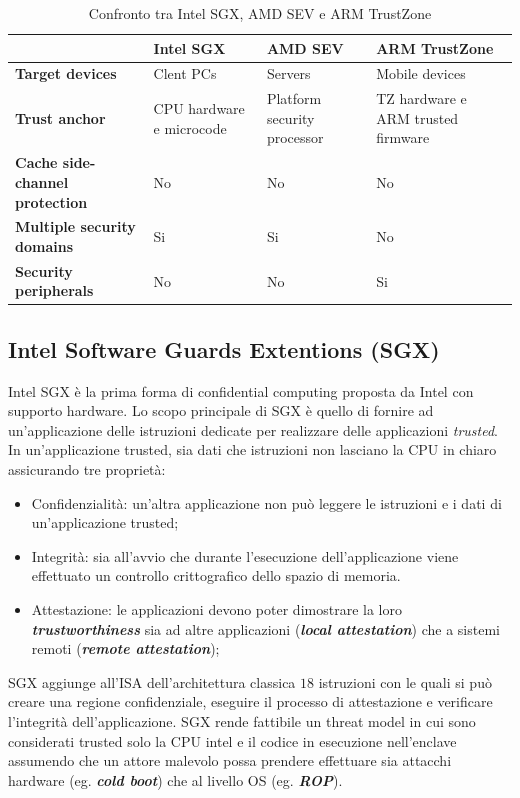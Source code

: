 \documentclass{article}
\begin{document}
\begin{table}
\centering
\begin{tabular}{|p{3cm}|p{3cm}|p{3cm}|p{3cm}|}
\hline
\textbf{} & \textbf{Intel SGX} & \textbf{AMD SEV} & \textbf{ARM TrustZone} \\ \hline
\textbf{Target devices} & Clent PCs & Servers & Mobile devices  \\ \hline
\textbf{Trust anchor} & CPU hardware e microcode & Platform security processor & TZ hardware e ARM trusted firmware \\ \hline
\textbf{Cache side-channel protection} & No  & No  & No \\ \hline
\textbf{Multiple security domains} & Si & Si & No \\ \hline
\textbf{Security peripherals} & No & No & Si \\ \hline
\end{tabular}
\caption{Confronto tra Intel SGX, AMD SEV e ARM TrustZone}
\label{tab:tee-implementations}
\end{table}

\subsection{Intel Software Guards Extentions (SGX)}
Intel SGX è la prima forma di confidential computing proposta da Intel con supporto hardware. Lo scopo principale di SGX è quello di fornire ad un'applicazione delle istruzioni dedicate per realizzare delle applicazioni \textit{trusted}. In un'applicazione trusted, sia dati che istruzioni non lasciano la CPU in chiaro assicurando tre proprietà:
\begin{itemize}
  \item Confidenzialità: un'altra applicazione non può leggere le istruzioni e i dati di un'applicazione trusted;
  \item Integrità: sia all'avvio che durante l'esecuzione dell'applicazione viene effettuato un controllo crittografico dello spazio di memoria. 
  \item Attestazione: le applicazioni devono poter dimostrare la loro \textbf{\textit{trustworthiness}} sia ad altre applicazioni (\textbf{\textit{local attestation}}) che a sistemi remoti (\textbf{\textit{remote attestation}});
\end{itemize}

SGX aggiunge all'ISA dell'architettura classica $18$ istruzioni con le quali si può creare una regione confidenziale, eseguire il processo di attestazione e verificare l'integrità dell'applicazione. 
SGX rende fattibile un threat model in cui sono considerati trusted solo la CPU intel e il codice in esecuzione nell'enclave assumendo che un attore malevolo possa prendere effettuare sia attacchi hardware (eg. \textbf{\textit{cold boot}}) che al livello OS (eg. \textbf{\textit{ROP}}).
\end{document}
